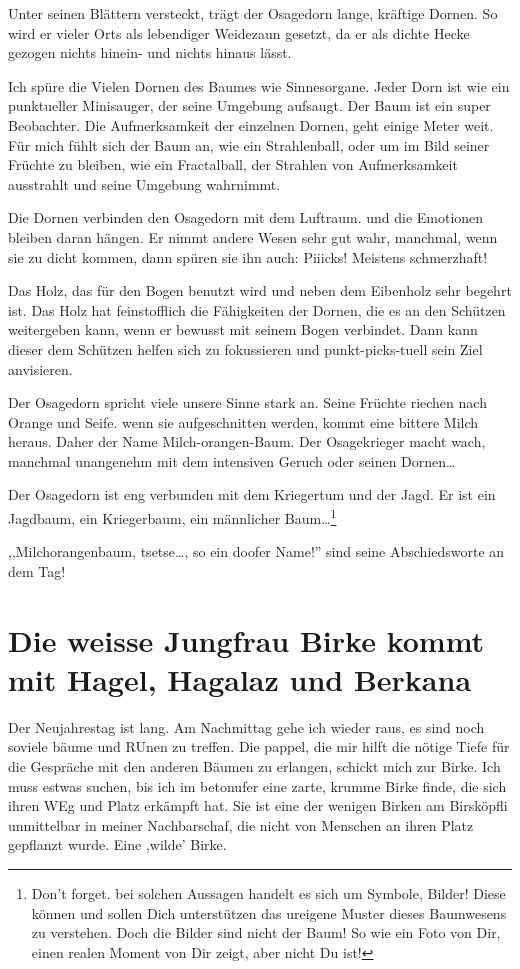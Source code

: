 \documentclass[11pt,titlepage,a5paper]{book}
\begin{document}
Unter seinen Blättern versteckt, trägt der Osagedorn lange, kräftige Dornen. So wird er vieler Orts als lebendiger Weidezaun gesetzt, da er als dichte Hecke gezogen nichts hinein- und nichts hinaus lässt. 

Ich spüre die Vielen Dornen des Baumes wie Sinnesorgane. Jeder Dorn ist wie ein punktueller Minisauger, der seine Umgebung aufsaugt. Der Baum ist ein super Beobachter. Die Aufmerksamkeit der einzelnen Dornen, geht einige Meter weit. Für mich fühlt sich der Baum an, wie ein Strahlenball, oder um im Bild seiner Früchte zu bleiben, wie ein Fractalball, der Strahlen von Aufmerksamkeit ausstrahlt und seine Umgebung wahrnimmt.

Die Dornen verbinden den Osagedorn mit dem Luftraum. und die Emotionen bleiben daran hängen. Er nimmt andere Wesen sehr gut wahr, manchmal, wenn sie zu dicht kommen, dann spüren sie ihn auch: Piiicks! Meistens schmerzhaft!

Das Holz, das für den Bogen benutzt wird und neben dem Eibenholz sehr begehrt ist. Das Holz hat feinstofflich die Fähigkeiten der Dornen, die es an den Schützen weitergeben kann, wenn er bewusst mit seinem Bogen verbindet. Dann kann dieser dem Schützen helfen sich zu fokussieren und punkt-picks-tuell sein Ziel anvisieren.

Der Osagedorn spricht viele unsere Sinne stark an. Seine Früchte riechen nach Orange und Seife. wenn sie aufgeschnitten werden, kommt eine bittere Milch heraus. Daher der Name Milch-orangen-Baum. Der Osagekrieger macht wach, manchmal unangenehm mit dem intensiven Geruch oder seinen Dornen\dots

Der Osagedorn ist eng verbunden mit dem Kriegertum und der Jagd. Er ist ein Jagdbaum, ein Kriegerbaum, ein männlicher Baum\dots\footnote{Don't forget. bei solchen Aussagen handelt es sich um Symbole, Bilder! Diese können und sollen Dich unterstützen das ureigene Muster dieses Baumwesens zu verstehen. Doch die Bilder sind nicht der Baum! So wie ein Foto von Dir, einen realen Moment von Dir zeigt, aber nicht Du ist!}

,,Milchorangenbaum, tsetse\dots, so ein doofer Name!'' sind seine Abschiedsworte an dem Tag!


\section{Die weisse Jungfrau Birke kommt mit Hagel, Hagalaz  und Berkana  }

Der Neujahrestag ist lang. Am Nachmittag gehe ich wieder  raus, es sind noch soviele bäume und RUnen zu treffen. Die pappel, die mir hilft die nötige Tiefe für die Gespräche mit den anderen Bäumen zu erlangen, schickt mich zur Birke. Ich muss estwas suchen, bis ich im betonufer eine zarte, krumme Birke finde, die sich ihren WEg und Platz erkämpft hat. Sie ist eine der wenigen Birken am Birsköpfli unmittelbar in meiner Nachbarschaf, die nicht von Menschen an ihren Platz gepflanzt wurde. Eine ,wilde' Birke.
\end{document}
